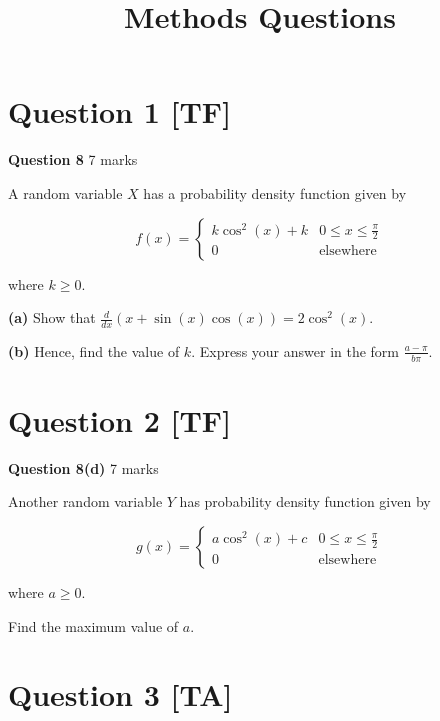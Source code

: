\documentclass[12pt,a4paper]{article}
\title{Methods Questions}
\author{}
\date{}
\begin{document}
\maketitle

\section*{Question 1 [TF]}

\textbf{Question 8} \hfill 7 marks

A random variable $X$ has a probability density function given by

\[
f(x) = \begin{cases}
k\cos^2(x) + k & 0 \leq x \leq \frac{\pi}{2} \\
0 & \text{elsewhere}
\end{cases}
\]

where $k \geq 0$.

\textbf{(a)} Show that $\frac{d}{dx}(x + \sin(x)\cos(x)) = 2\cos^2(x)$.

\vspace{5\baselineskip}

\textbf{(b)} Hence, find the value of $k$. Express your answer in the form $\frac{a-\pi}{b\pi}$.

\vspace{5\baselineskip}

\hrulefill

\section*{Question 2 [TF]}

\textbf{Question 8(d)} \hfill 7 marks

Another random variable $Y$ has probability density function given by

\[
g(x) = \begin{cases}
a\cos^2(x) + c & 0 \leq x \leq \frac{\pi}{2} \\
0 & \text{elsewhere}
\end{cases}
\]

where $a \geq 0$.

Find the maximum value of $a$.

\vspace{5\baselineskip}

\hrulefill

\section*{Question 3 [TA]}
\end{document}
